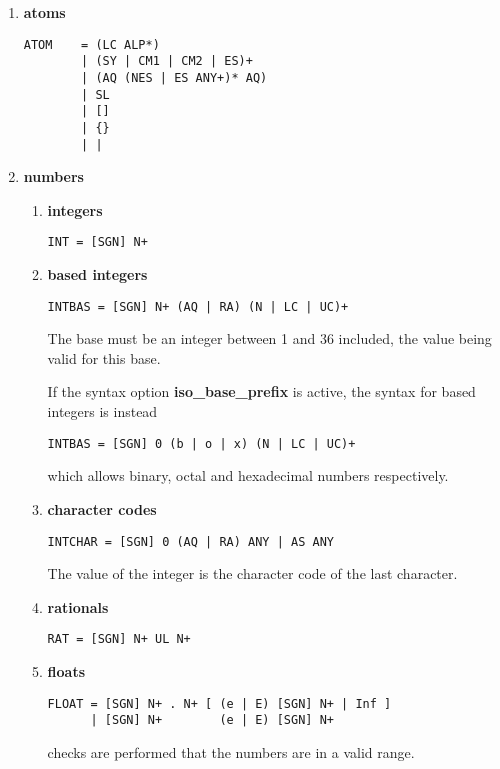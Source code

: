 \begin{enumerate}
\item {\bf atoms}
\begin{verbatim}
ATOM    = (LC ALP*)
        | (SY | CM1 | CM2 | ES)+
        | (AQ (NES | ES ANY+)* AQ)
        | SL
        | []
        | {}
        | |
\end{verbatim}

\item{\bf numbers}

\begin{enumerate}

\item{\bf integers}\\
\begin{verbatim}
INT = [SGN] N+
\end{verbatim}

\item{\bf based integers}\\
\begin{verbatim}
INTBAS = [SGN] N+ (AQ | RA) (N | LC | UC)+
\end{verbatim}
The base must be an integer between 1 and 36 included, the value 
being valid for this base.

If the syntax option {\bf iso_base_prefix} is active, the syntax for based
integers is instead
\begin{verbatim}
INTBAS = [SGN] 0 (b | o | x) (N | LC | UC)+
\end{verbatim}
which allows binary, octal and hexadecimal numbers respectively.

\item{\bf character codes}\\
\begin{verbatim}
INTCHAR = [SGN] 0 (AQ | RA) ANY | AS ANY
\end{verbatim}
The value of the integer is the character code of the last character.

\item{\bf rationals}
\begin{verbatim}
RAT = [SGN] N+ UL N+
\end{verbatim}

\item{\bf floats}
\begin{verbatim}
FLOAT = [SGN] N+ . N+ [ (e | E) [SGN] N+ | Inf ]
      | [SGN] N+        (e | E) [SGN] N+
\end{verbatim}
checks are performed that the numbers are in a valid range.


\end{enumerate}
\end{enumerate}
